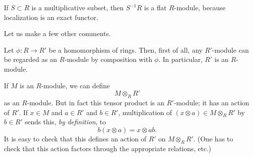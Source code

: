 \begin{example} 
If $S \subset R$ is a multiplicative subset, then  $S^{-1}R $ is a flat $R$-module, because localization is an
exact functor.
\end{example} 

Let us make a few other comments.

\begin{remark}
Let $\phi: R \to R'$ be a homomorphism of rings. Then, first of all, any
$R'$-module can be regarded as an $R$-module by composition with $\phi$. In
particular, $R'$ is an $R$-module.

If $M$ is an $R$-module, we can define
\[ M \otimes_R R'  \]
as an $R$-module. But in fact this tensor product is an $R'$-module; it has
an action of $R'$.   If $x \in M$ and $a \in R'$ and $b \in R'$, multiplication
of $(x \otimes a) \in M \otimes_R R'$ by $b \in R'$ sends this, \emph{by
definition}, to
\[ b(x \otimes a) = x \otimes ab.  \]
It is easy to check that this defines an action of $R'$ on $M \otimes_R R'$.
(One has to check that this action factors through the appropriate relations,
etc.)

\end{remark}

